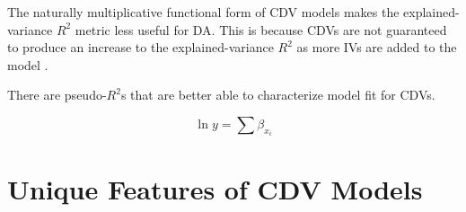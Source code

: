 \documentclass[ShortAfour,times,sageapa]{sagej}
\begin{document}
	The naturally multiplicative functional form of CDV models makes the explained-variance $R^2$ metric less useful for DA.  This is because CDVs are not guaranteed to produce an increase to the explained-variance $R^2$ as more IVs are added to the model \cite{}.  
	
	There are pseudo-$R^2$s that are better able to characterize model fit for CDVs.  
	
	
	\begin{equation}
		\ln{y} = \sum{\beta_{x_i}}
	\end{equation}

\section{Unique Features of CDV Models}
	
\end{document}
